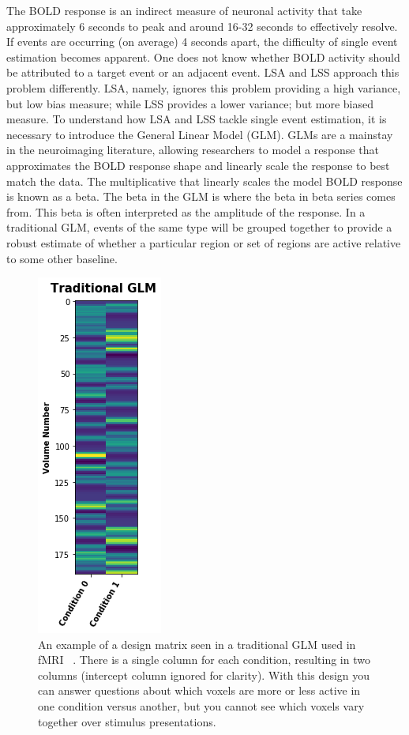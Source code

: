 \documentclass[10pt,letterpaper]{article}
\begin{document}
The BOLD response is an indirect measure of neuronal activity that take approximately 6 seconds to
peak and around 16-32 seconds to effectively resolve.
If events are occurring (on average) 4 seconds apart, the difficulty of single event estimation
becomes apparent.
One does not know whether BOLD activity should be attributed to a target event or an
adjacent event.
LSA and LSS approach this problem differently.
LSA, namely, ignores this problem providing a high variance, but low bias measure; while LSS provides
a lower variance; but more biased measure.
To understand how LSA and LSS tackle single event estimation, it is necessary to introduce
the General Linear Model (GLM).
GLMs are a mainstay in the neuroimaging literature, allowing researchers to model
a response that approximates the BOLD response shape and linearly scale the response
to best match the data.
The multiplicative that linearly scales the model BOLD response is known as a beta.
The beta in the GLM is where the beta in beta series comes from.
This beta is often interpreted as the amplitude of the response.
In a traditional GLM, events of the same type will be grouped together
to provide a robust estimate of whether a particular region or set of regions are
active relative to some other baseline.

\begin{figure}[H]
  \centering
  \includegraphics{introduction-normalGLM}
  \caption{
    An example of a design matrix seen in a traditional GLM used in fMRI ~\cite{Friston1995}.
    There is a single column for each condition, resulting in two columns (intercept column ignored for clarity).
    With this design you can answer questions about which voxels are more or less active in one condition
    versus another, but you cannot see which voxels vary together over stimulus presentations.
  }
  \label{fig:introGLM}
\end{figure}
\end{document}
